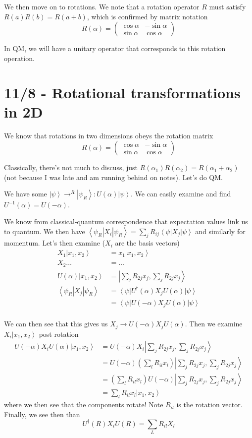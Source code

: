 \documentclass[10pt]{report}
\newcommand{\bra}[1]{\left<#1\right|}
\newcommand{\ket}[1]{\left|#1\right>}
\begin{document}
We then move on to rotations. We note that a rotation operator $R$ must satisfy $R(a)R(b) = R(a+b)$, which is confirmed by matrix notation
$$R(\alpha) = \begin{pmatrix}\cos \alpha & -\sin \alpha \\ \sin \alpha & \cos \alpha\end{pmatrix}$$

In QM, we will have a unitary operator that corresponds to this rotation operation. 

\chapter{11/8 - Rotational transformations in 2D}

We know that rotations in two dimensions obeys the rotation matrix 
$$R(\alpha) = \begin{pmatrix}\cos \alpha & -\sin \alpha \\ \sin \alpha & \cos \alpha\end{pmatrix}$$

Classically, there's not much to discuss, just $R(\alpha_1)R(\alpha_2) = R(\alpha_1 + \alpha_2)$ (not because I was late and am running behind on notes). Let's do QM.

We have some $\ket{\psi} \to^R \ket{\psi_R}: U(\alpha) \ket{\psi}$. We can easily examine and find $U^{-1}(\alpha) = U(-\alpha)$. 

We know from classical-quantum correspondence that expectation values link us to quantum. We then have $\bra{\psi_R}X_i\ket{\psi_R} = \sum_j R_{ij}\bra{\psi}X_j\ket{\psi}$ and similarly for momentum. Let's then examine ($X_i$ are the basis vectors)
\begin{align}
	X_1 \ket{x_1, x_2} &= x_1\ket{x_1, x_2}\\
	X_2 \dots &= \dots\\
	U(\alpha) \ket{x_1, x_2} &= \ket{\sum_j R_{2j}x_j, \sum_j R_{2j}x_j}\\
	\bra{\psi_R}X_j\ket{\psi_R} &= \bra{\psi}U^\dagger(\alpha)X_jU(\alpha)\ket{\psi}\\
	&=\bra{\psi}U(-\alpha)X_jU(\alpha)\ket{\psi}\\
\end{align}

We can then see that this gives us $X_j \to U(-\alpha)X_jU(\alpha)$. Then we examine $X_i\ket{x_1, x_2}$ post rotation
\begin{align}
	U(-\alpha)X_iU(\alpha)\ket{x_1, x_2} &= U(-\alpha)X_i\ket{\sum_j R_{2j}x_j, \sum_j R_{2j}x_j}\\
	&= U(-\alpha) \left( \sum_l R_{il}x_l \right)\ket{\sum_j R_{2j}x_j, \sum_j R_{2j}x_j}\\
	&= \left( \sum_l R_{il}x_l \right)U(-\alpha) \ket{\sum_j R_{2j}x_j, \sum_j R_{2j}x_j}\\
	&= \sum_l R_{il} x_l \ket{x_1, x_2}
\end{align}
where we then see that the components rotate! Note $R_{il}$ is the rotation vector. Finally, we see then than
$$U^\dagger(R) X_i U(R) = \sum_L R_{il}X_l$$
\end{document}
